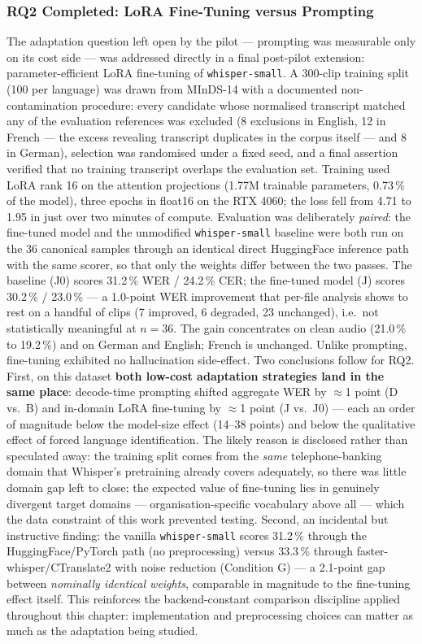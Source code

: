 \documentclass[12pt]{report}
\begin{document}
\subsubsection{RQ2 Completed: LoRA Fine-Tuning versus Prompting}
The adaptation question left open by the pilot --- prompting was measurable only on its cost side --- was addressed directly in a final post-pilot extension: parameter-efficient LoRA fine-tuning of \texttt{whisper-small}. A 300-clip training split (100 per language) was drawn from MInDS-14 with a documented non-contamination procedure: every candidate whose normalised transcript matched any of the evaluation references was excluded (8 exclusions in English, 12 in French --- the excess revealing transcript duplicates in the corpus itself --- and 8 in German), selection was randomised under a fixed seed, and a final assertion verified that no training transcript overlaps the evaluation set. Training used LoRA rank 16 on the attention projections (1.77M trainable parameters, 0.73\,\% of the model), three epochs in float16 on the RTX 4060; the loss fell from 4.71 to 1.95 in just over two minutes of compute.
Evaluation was deliberately \emph{paired}: the fine-tuned model and the unmodified \texttt{whisper-small} baseline were both run on the 36 canonical samples through an identical direct HuggingFace inference path with the same scorer, so that only the weights differ between the two passes. The baseline (J0) scores 31.2\,\% WER / 24.2\,\% CER; the fine-tuned model (J) scores 30.2\,\% / 23.0\,\% --- a 1.0-point WER improvement that per-file analysis shows to rest on a handful of clips (7 improved, 6 degraded, 23 unchanged), i.e.\ not statistically meaningful at $n=36$. The gain concentrates on clean audio (21.0\,\% to 19.2\,\%) and on German and English; French is unchanged. Unlike prompting, fine-tuning exhibited no hallucination side-effect.
Two conclusions follow for RQ2. First, on this dataset \textbf{both low-cost adaptation strategies land in the same place}: decode-time prompting shifted aggregate WER by $\approx$1 point (D vs.\ B) and in-domain LoRA fine-tuning by $\approx$1 point (J vs.\ J0) --- each an order of magnitude below the model-size effect (14--38 points) and below the qualitative effect of forced language identification. The likely reason is disclosed rather than speculated away: the training split comes from the \emph{same} telephone-banking domain that Whisper's pretraining already covers adequately, so there was little domain gap left to close; the expected value of fine-tuning lies in genuinely divergent target domains --- organisation-specific vocabulary above all --- which the data constraint of this work prevented testing. Second, an incidental but instructive finding: the vanilla \texttt{whisper-small} scores 31.2\,\% through the HuggingFace/PyTorch path (no preprocessing) versus 33.3\,\% through faster-whisper/CTranslate2 with noise reduction (Condition G) --- a 2.1-point gap between \emph{nominally identical weights}, comparable in magnitude to the fine-tuning effect itself. This reinforces the backend-constant comparison discipline applied throughout this chapter: implementation and preprocessing choices can matter as much as the adaptation being studied.
\end{document}
